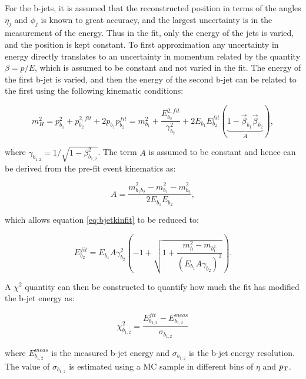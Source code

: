 For the b-jets, it is assumed that the reconstructed position in terms of the
angles $\eta_{j}$ and $\phi_{j}$ is known to great accuracy, and the largest
uncertainty is in the measurement of the energy. Thus in the fit, only the
energy of the jets is varied, and the position is kept constant. To first
approximation any uncertainty in energy directly translates to an uncertainty in
momentum related by the quantity $\beta = p/E$, which is assumed to be constant and 
not varied in the fit. The energy of the first b-jet is varied, and then the
energy of the second b-jet can be related to the first using the following
kinematic conditions:

\begin{equation}
m_{H}^{2} = p_{b_{1}}^{2} + p_{b_{2}}^{2,fit} + 2p_{b_{1}}p_{b_{2}}^{fit} 
          = m_{b_{1}}^{2} + \frac{E_{b_{2}}^{2,fit}}{\gamma_{b_{2}}^{2}} +
          2E_{b_{1}}E_{b_{2}}^{fit}\left(\underbrace{1-\vec{\beta}_{b_{1}}\vec{\beta}_{b_{2}}}_{A}\right),   
\label{eq:bjetkinfit}         
\end{equation}

where $\gamma_{b_{1,2}} = 1/\sqrt{1-\beta_{b_{1,2}}^{2}}$. The term $A$ is
assumed to be constant and hence can be derived from the pre-fit event
kinematics as:

\begin{equation}
A = \frac{m_{b_{1}b_{2}}^{2} - m_{b_{1}}^{2} - m_{b_{2}}^{2}}{2E_{b_{1}}E_{b_{2}}} , 
\end{equation}

which allows equation \ref{eq:bjetkinfit} to be reduced to:

\begin{equation}
E_{b_{2}}^{fit} = E_{b_{1}}A\gamma_{b_{2}}^{2}\left(-1 + \sqrt{1 +
\frac{m_{h}^{2} -
m_{b_{1}^{2}}}{\left(E_{b_{1}}A\gamma_{b_{2}}\right)^{2}}}\right) .
\label{eq:bjetrelation}
\end{equation}

A $\chi^{2}$ quantity can then be constructed to quantify how much the fit has
modified the b-jet energy as:

\begin{equation}
\chi_{b_{1,2}}^{2} = \frac{E_{b_{1,2}}^{fit} -
E_{b_{1,2}}^{meas}}{\sigma_{b_{1,2}}}
\end{equation}

where $E_{b_{1,2}}^{meas}$ is the measured b-jet energy and $\sigma_{b_{1,2}}$
is the b-jet energy resolution. The value of $\sigma_{b_{1,2}}$ is estimated
using a \ac{MC} sample in different bins of $\eta$ and $p_{\mathrm{T}}$. 

